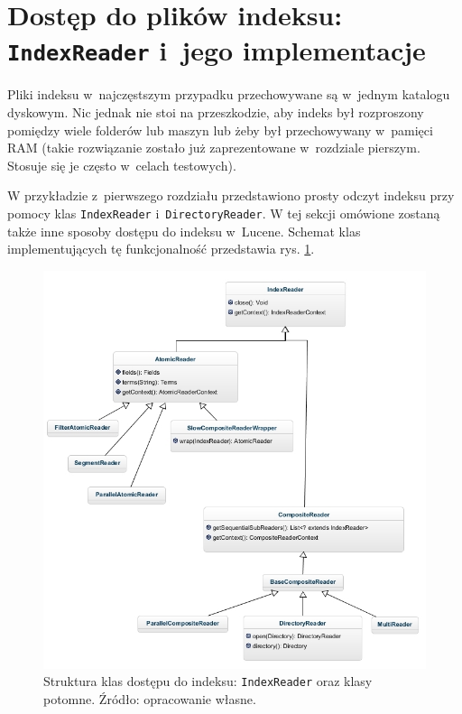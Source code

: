 \section{Dostęp do plików indeksu: \texttt{IndexReader} i~jego implementacje}
\label{sec:indexReader}

Pliki indeksu w~najczęstszym przypadku przechowywane są w~jednym katalogu dyskowym. Nic jednak nie stoi na przeszkodzie, aby indeks był rozproszony pomiędzy wiele folderów lub maszyn lub żeby był przechowywany w~pamięci RAM (takie rozwiązanie zostało już zaprezentowane w~rozdziale pierszym. Stosuje się je często w~celach testowych).

W przykładzie z~pierwszego rozdziału przedstawiono prosty odczyt indeksu przy pomocy klas \texttt{IndexReader} i~\texttt{DirectoryReader}. W tej sekcji omówione zostaną także inne sposoby dostępu do indeksu w~Lucene. Schemat klas implementujących tę funkcjonalność przedstawia rys. \ref{fig:indexReader}. 

\begin{figure}[p]
 \centering
 \includegraphics[scale=0.64]{pictures/Readers_1.jpg}
 \caption{Struktura klas dostępu do indeksu: \texttt{IndexReader} oraz klasy potomne. Źródło: opracowanie własne. \label{fig:indexReader}}
\end{figure}


